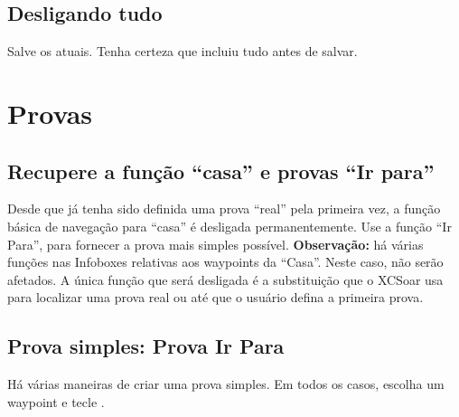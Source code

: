 \documentclass[a4paper,12pt]{refrep}
\begin{document}
\subsection*{\textcolor{flashblue}{Desligando tudo}}
Salve os atuais.  Tenha certeza que incluiu tudo antes de salvar.

\section{Provas}

\subsection{\textcolor{flashblue}{Recupere a função “casa” e provas “Ir para”}}
Desde que já tenha sido definida uma prova “real” pela primeira vez, a função básica de navegação para “casa” é desligada permanentemente.  Use a função “Ir Para”, para fornecer a prova mais simples possível. \textbf{Observação:} há várias funções nas Infoboxes relativas aos waypoints da “Casa”.  Neste caso, não serão afetados.  A única função que será desligada é a substituição que o XCSoar usa para localizar uma prova real ou até que o usuário defina a primeira prova.

\subsection{\textcolor{flashblue}{Prova simples: Prova Ir Para}}
Há várias maneiras de criar uma prova simples.  Em todos os casos, escolha um waypoint e tecle .
\end{document}
